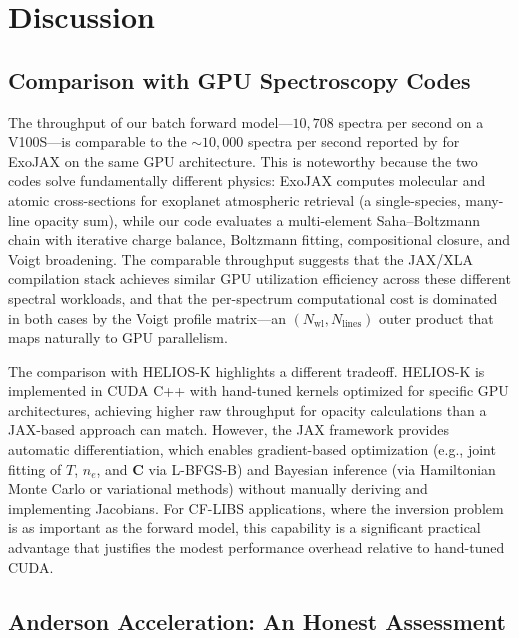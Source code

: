 \documentclass[preprint,12pt,authoryear]{elsarticle}
\begin{document}
\section{Discussion}
\label{sec:discussion}

\subsection{Comparison with GPU Spectroscopy Codes}

The throughput of our batch forward model---$10{,}708$ spectra per second on a V100S---is
comparable to the $\sim 10{,}000$ spectra per second reported by \citet{Kawahara2022} for ExoJAX on the same GPU architecture.
This is noteworthy because the two codes solve fundamentally different physics: ExoJAX computes molecular and atomic cross-sections for exoplanet atmospheric retrieval (a single-species, many-line opacity sum), while our code evaluates a multi-element Saha--Boltzmann chain with iterative charge balance, Boltzmann fitting, compositional closure, and Voigt broadening.
The comparable throughput suggests that the JAX/XLA compilation stack achieves similar GPU utilization efficiency across these different spectral workloads, and that the per-spectrum computational cost is dominated in both cases by the Voigt profile matrix---an $(N_\mathrm{wl}, N_\mathrm{lines})$ outer product that maps naturally to GPU parallelism.

The comparison with HELIOS-K \citep{Grimm2021} highlights a different tradeoff.
HELIOS-K is implemented in CUDA C++ with hand-tuned kernels optimized for specific GPU architectures, achieving higher raw throughput for opacity calculations than a JAX-based approach can match.
However, the JAX framework provides automatic differentiation, which enables gradient-based optimization (e.g., joint fitting of $T$, $n_e$, and $\bm{C}$ via L-BFGS-B) and Bayesian inference (via Hamiltonian Monte Carlo or variational methods) without manually deriving and implementing Jacobians.
For CF-LIBS applications, where the inversion problem is as important as the forward model, this capability is a significant practical advantage that justifies the modest performance overhead relative to hand-tuned CUDA.

\subsection{Anderson Acceleration: An Honest Assessment}
\end{document}
